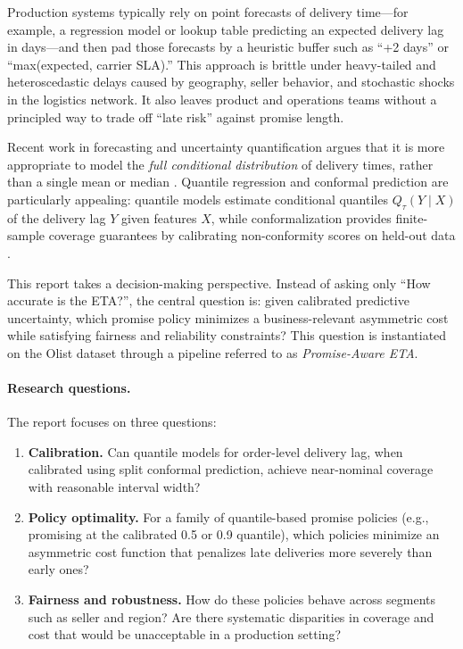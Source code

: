 \documentclass[10pt,twocolumn]{article}
\begin{document}
Production systems typically rely on point forecasts of delivery time---for example, a regression model or lookup table predicting an expected delivery lag in days---and then pad those forecasts by a heuristic buffer such as ``+2 days'' or ``max(expected, carrier SLA).'' This approach is brittle under heavy-tailed and heteroscedastic delays caused by geography, seller behavior, and stochastic shocks in the logistics network. It also leaves product and operations teams without a principled way to trade off ``late risk'' against promise length.

Recent work in forecasting and uncertainty quantification argues that it is more appropriate to model the \emph{full conditional distribution} of delivery times, rather than a single mean or median \citep{koenker1978,koenker2001,lightgbm2017,zhang2023calibration}. Quantile regression and conformal prediction are particularly appealing: quantile models estimate conditional quantiles $Q_\tau(Y \mid X)$ of the delivery lag $Y$ given features $X$, while conformalization provides finite-sample coverage guarantees by calibrating non-conformity scores on held-out data \citep{romano2019conformalized,angelopoulos2021gentle}.

This report takes a decision-making perspective. Instead of asking only ``How accurate is the ETA?'', the central question is: given calibrated predictive uncertainty, which promise policy minimizes a business-relevant asymmetric cost while satisfying fairness and reliability constraints? This question is instantiated on the Olist dataset \citep{olistdataset} through a pipeline referred to as \emph{Promise-Aware ETA}.

\paragraph{Research questions.}
The report focuses on three questions:
\begin{enumerate}
  \item \textbf{Calibration.} Can quantile models for order-level delivery lag, when calibrated using split conformal prediction, achieve near-nominal coverage with reasonable interval width?
  \item \textbf{Policy optimality.} For a family of quantile-based promise policies (e.g., promising at the calibrated 0.5 or 0.9 quantile), which policies minimize an asymmetric cost function that penalizes late deliveries more severely than early ones?
  \item \textbf{Fairness and robustness.} How do these policies behave across segments such as seller and region? Are there systematic disparities in coverage and cost that would be unacceptable in a production setting?
\end{enumerate}
\end{document}
